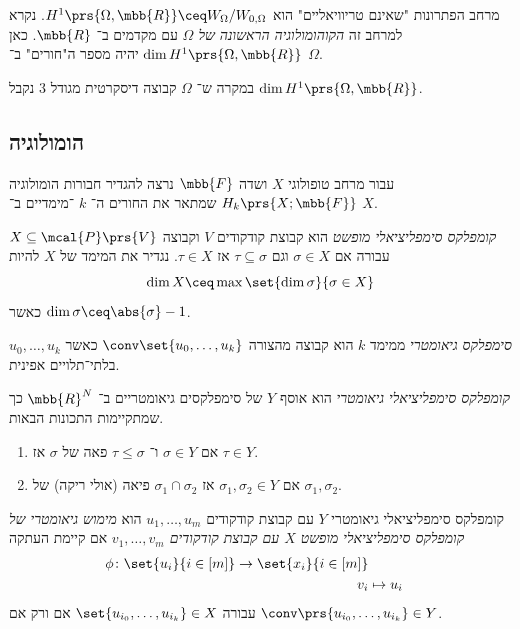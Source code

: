 \documentclass[a4paper,10pt,twoside,openany]{book}
\begin{document}
\begin{definition}
מרחב הפתרונות "שאינם טריוויאליים" הוא
$H^1\prs{\Omega, \mbb{R}} \ceq W_\Omega/W_{0,\Omega}$.
נקרא למרחב זה
\emph{הקוהומולוגיה הראשונה של
$\Omega$}
עם מקדמים ב־%
$\mbb{R}$.
כאן
$\dim H^1\prs{\Omega, \mbb{R}}$
יהיה מספר ה"חורים" ב־%
$\Omega$.
\end{definition}

\begin{example}
במקרה ש־%
$\Omega$
קבוצה דיסקרטית מגודל
$3$
נקבל
$\dim H^1\prs{\Omega, \mbb{R}}$.
\end{example}

\subsection{הומולוגיה}

עבור מרחב טופולוגי
$X$
ושדה
$\mbb{F}$
נרצה להגדיר חבורות הומולוגיה
$H_k\prs{X;\mbb{F}}$
שמתאר את החורים ה־%
$k$%
־מימדיים ב־%
$X$.

\begin{definition}
\emph{קומפלקס סימפליציאלי מופשט}
הוא קבוצת קודקודים
$V$
וקבוצה
$X \subseteq \mcal{P}\prs{V}$
עבורה אם
$\sigma \in X$
וגם
$\tau \subseteq \sigma$
אז
$\tau \in X$.
נגדיר את המימד של
$X$
להיות
\[\dim X \ceq \max\set{\dim \sigma}{\sigma \in X}\]
כאשר
$\dim \sigma \ceq \abs{\sigma} - 1$.
\end{definition}

\begin{definition}
\emph{סימפלקס גיאומטרי}
ממימד
$k$
הוא קבוצה מהצורה
$\conv\set{u_0, \ldots, u_k}$
כאשר
$u_0, \ldots, u_k$
בלתי־תלויים אפינית.
\end{definition}

\begin{definition}
\emph{קומפלקס סימפליציאלי גיאומטרי}
הוא אוסף
$Y$
של סימפלקסים גיאומטריים ב־%
$\mbb{R}^N$
כך שמתקיימות התכונות הבאות.
\begin{enumerate}
\item אם
$\sigma \in Y$
ו־%
$\tau \leq \sigma$
פאה של
$\sigma$
אז
$\tau \in Y$.
\item אם
$\sigma_1, \sigma_2 \in Y$
אז
$\sigma_1 \cap \sigma_2$
פיאה (אולי ריקה) של
$\sigma_1, \sigma_2$.
\end{enumerate}
\end{definition}

\begin{definition}
קומפלקס סימפליציאלי גיאומטרי
$Y$
עם קבוצת קודקודים
$u_1, \ldots, u_m$
הוא
\emph{מימוש גיאומטרי של קומפלקס סימפליציאלי מופשט
$X$
עם קבוצת קודקודים
$v_1, \ldots, v_m$}
אם קיימת העתקה
\begin{align*}
\phi \colon \set{u_i}{i \in [m]} \to \set{x_i}{i \in [m]} \\
v_i &\mapsto u_i
\end{align*}
עבורה
$\set{u_{i_0}, \ldots, u_{i_k}} \in X$
אם ורק אם
$\conv\prs{u_{i_0}, \ldots, u_{i_k}} \in Y$.
\end{definition}
\end{document}

